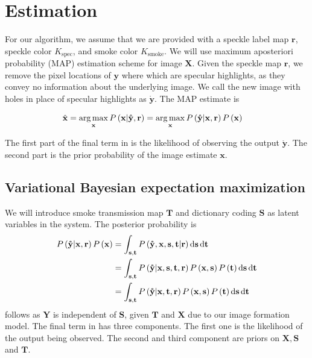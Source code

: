 \chapter{Estimation}

For our algorithm, we assume that we are provided with a speckle label map $\mathbf{r}$, speckle color $K_\text{spec}$, and smoke color $K_\text{smoke}$. We will use maximum aposteriori probability (MAP) estimation scheme for image $\mathbf{X}$. Given the speckle map $\mathbf{r}$, we remove the pixel locations of $\mathbf{y}$ where which are specular highlights, as they convey no information about the underlying image. We call the new image with holes in place of specular highlights as $\mathbf{\mathring y}$. The MAP estimate is

\begin{align}
\hat{\mathbf{x}} &= \operatorname*{arg\,max}_\mathbf{x} P \left( \mathbf{x} | \mathbf{\mathring y}, \mathbf{r} \right) = \operatorname*{arg\,max}_\mathbf{x} P \left( \mathbf{\mathring y} | \mathbf{x}, \mathbf{r} \right) P \left( \mathbf{x} \right) \label{eqn:simplemap}
\end{align}

The first part of the final term in  is the likelihood of observing the output $\mathbf{\mathring y}$. The second part is the prior probability of the image estimate $\mathbf{x}$.


\section{Variational Bayesian expectation maximization}
We will introduce smoke transmission map $\mathbf{T}$ and dictionary coding $\mathbf{S}$ as latent variables in the system. The posterior probability is 
\begin{align}
P \left( \mathbf{\mathring y} | \mathbf{x}, \mathbf{r} \right) P \left( \mathbf{x} \right) &= \int_{\mathbf{s}, \mathbf{t}} P \left( \mathbf{\mathring y}, \mathbf{x}, \mathbf{s}, \mathbf{t} | \mathbf{r} \right) \mathop{}\!\mathrm{d} \mathbf{s} \mathop{}\!\mathrm{d}\mathbf{t} \\
&= \int_{\mathbf{s}, \mathbf{t}} P \left( \mathbf{\mathring y} | \mathbf{x}, \mathbf{s},  \mathbf{t}, \mathbf{r} \right)  P \left(\mathbf{x}, \mathbf{s} \right) P \left( \mathbf{t} \right) \mathop{}\!\mathrm{d}\mathbf{s} \mathop{}\!\mathrm{d}\mathbf{t} \label{eqn:mapDerive1}\\
&= \int_{\mathbf{s}, \mathbf{t}} P \left( \mathbf{\mathring y} | \mathbf{x}, \mathbf{t}, \mathbf{r} \right)  P \left(\mathbf{x}, \mathbf{s} \right) P \left( \mathbf{t} \right) \mathop{}\!\mathrm{d}\mathbf{s} \mathop{}\!\mathrm{d}\mathbf{t}  \label{eqn:mapDerive2}
\end{align}
 follows as $\mathbf{Y}$ is independent of $\mathbf{S}$, given $\mathbf{T}$ and $\mathbf{X}$ due to our image formation model.
The final term in  has three components. The first one is the likelihood of the output being observed. The second and third component are priors on $\mathbf{X}, \mathbf{S}$ and $\mathbf{T}$.


